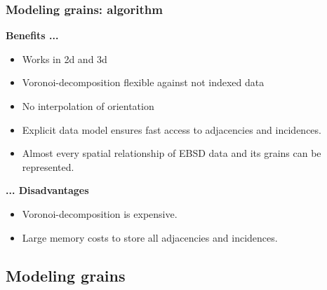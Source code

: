 \begin{frame}[fragile]
  \frametitle{Modeling grains: algorithm}


\textbf{Benefits ... }
\begin{itemize}
\item Works in 2d and 3d
\item Voronoi-decomposition flexible against not indexed data
\item No interpolation of orientation
\item Explicit data model ensures fast access to adjacencies and incidences.
\item Almost every spatial relationship of EBSD data and its grains can be represented.
\end{itemize}


\textbf{... Disadvantages}
\begin{itemize}
\item Voronoi-decomposition is expensive.
\item Large memory costs to store all adjacencies and incidences.
\end{itemize}

\end{frame}



\subsection*{Modeling grains}

